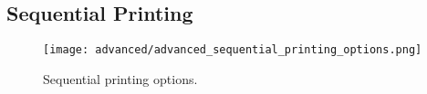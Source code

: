 
\subsection{Sequential Printing} %
\label{sec:sequential_printing}

\begin{figure}[H]
\centering
\texttt{[image: advanced/advanced\_sequential\_printing\_options.png]}
\caption{Sequential printing options.}
\label{fig:advanced_sequential_printing_options}
\end{figure}


